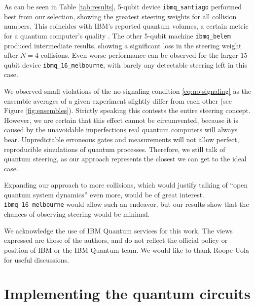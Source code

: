 \documentclass[aps,pra,twocolumn,superscriptaddress,showemail,showpacs,longbibliography]{revtex4-2}
\begin{document}
As can be seen in Table \ref{tab:results}, 5-qubit device \texttt{ibmq\_santiago} performed best from our selection, showing the greatest steering weights for all collision numbers. This coincides with IBM's reported quantum volumes, a certain metric for a quantum computer's quality \cite{ibmq2021}. The other 5-qubit machine \texttt{ibmq\_belem} produced intermediate results, showing a significant loss in the steering weight after $N=4$ collisions. Even worse performance can be observed for the larger 15-qubit device \texttt{ibmq\_16\_melbourne}, with barely any detectable steering left in this case.

We observed small violations of the no-signaling condition \eqref{eq:no-signaling} as the ensemble averages of a given experiment slightly differ from each other (see Figure \ref{fig:ensembles}). Strictly speaking this contests the entire steering concept. However, we are certain that this effect cannot be circumvented, because it is caused by the unavoidable imperfections real quantum computers will always bear. Unpredictable erroneous gates and measurements will not allow perfect, reproducible simulations of quantum processes. Therefore, we still talk of quantum steering, as our approach represents the closest we can get to the ideal case.

Expanding our approach to more collisions, which would justify talking of ``open quantum system dynamics'' even more, would be of great interest. \texttt{ibmq\_16\_melbourne} would allow such an endeavor, but our results show that the chances of observing steering would be minimal. 

\begin{acknowledgments}
We acknowledge the use of IBM Quantum services for this work. The views expressed are those of the authors, and do not reflect the official policy or position of IBM or the IBM Quantum team. We would like to thank Roope Uola for useful discussions.
\end{acknowledgments}

\appendix

\section{Implementing the quantum circuits}
\label{app:implementation}
\end{document}
